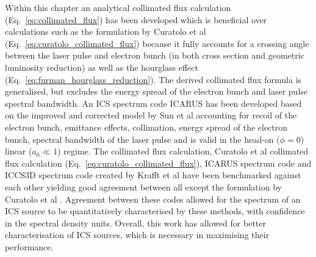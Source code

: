 \documentclass[../main.tex]{subfiles}
\begin{document}
Within this chapter an analytical collimated flux calculation (Eq.~\ref{eq:collimated_flux}) has been developed which is beneficial over calculations such as the formulation by Curatolo et al (Eq.~\ref{eq:curatolo_collimated_flux}) \cite{curatolo2017analytical} because it fully accounts for a crossing angle between the laser pulse and electron bunch (in both cross section and geometric luminosity reduction) as well as the hourglass effect (Eq.~\ref{eq:furman_hourglass_reduction}). The derived collimated flux formula is generalised, but excludes the energy spread of the electron bunch and laser pulse spectral bandwidth. An ICS spectrum code \textsc{ICARUS} has been developed based on the improved and corrected model by Sun et al \cite{sun2009characterizations,sun2011theoretical} accounting for recoil of the electron bunch, emittance effects, collimation, energy spread of the electron bunch, spectral bandwidth of the laser pulse and is valid in the head-on ($\phi=0$) linear ($a_{0} \ll 1$) regime. The collimated flux calculation, Curatolo et al collimated flux calculation (Eq.~\ref{eq:curatolo_collimated_flux}), \textsc{ICARUS} spectrum code and \textsc{ICCS3D} spectrum code created by Krafft et al \cite{krafft2016laser,ranjan2018simulation} have been benchmarked against each other yielding good agreement between all except the formulation by Curatolo et al \cite{curatolo2017analytical}. Agreement between these codes allowed for the spectrum of an ICS source to be quantitatively characterised by these methods, with confidence in the spectral density units. Overall, this work has allowed for better characterisation of ICS sources, which is necessary in maximising their performance.
\end{document}
